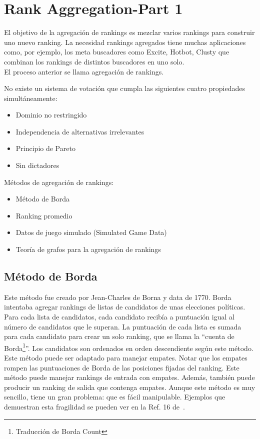 \section{Rank Aggregation-Part 1 \cite{langville2012s}}

El objetivo de la agregación de rankings es mezclar varios rankings para construir uno nuevo ranking. La necesidad rankings agregados tiene muchas aplicaciones como, por ejemplo, los meta buscadores como Excite, Hotbot, Clusty que combinan los rankings de distintos buscadores en uno solo.\\

El proceso anterior se llama agregación de rankings.\\

\begin{teo}
No existe un sistema de votación que cumpla las siguientes cuatro propiedades simultáneamente:

\begin{itemize}
\item Dominio no restringido
\item Independencia de alternativas irrelevantes
\item Principio de Pareto
\item Sin dictadores
\end{itemize}
\end{teo}

Métodos de agregación de rankings:
\begin{itemize}
\item Método de Borda
\item Ranking promedio
\item Datos de juego simulado (Simulated Game Data)
\item Teoría de grafos para la agregación de rankings
\end{itemize}

\subsection{Método de Borda}

Este método fue creado por Jean-Charles de Borna y data de 1770. Borda intentaba agregar rankings de listas de candidatos de unas elecciones políticas. Para cada lista de candidatos, cada candidato recibía a puntuación igual al número de candidatos que le superan. La puntuación de cada lista es sumada para cada candidato para crear un solo ranking, que se llama la ``cuenta de Borda\footnote{Traducción de Borda Count}''. Los candidatos son ordenados en orden descendiente según este método. Este método puede ser adaptado para  manejar empates. Notar que los empates rompen las puntuaciones de Borda de las posiciones fijadas del ranking. Este método puede manejar rankings de entrada con empates. Además, también puede producir un ranking de salida que contenga empates. Aunque este método es muy sencillo, tiene un gran problema: que es fácil manipulable. Ejemplos que demuestran esta fragilidad se pueden ver en la Ref. 16 de~\cite{langville2012s}.

